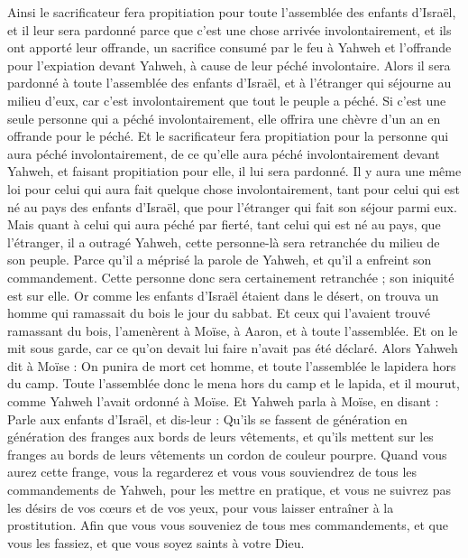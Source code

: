 \begin{multicols}{2}
Ainsi le sacrificateur fera propitiation pour toute l'assemblée des enfants d'Israël, et il leur sera pardonné parce que c'est une chose arrivée involontairement, et ils ont apporté leur offrande, un sacrifice consumé par le feu à Yahweh et l'offrande pour l'expiation devant Yahweh, à cause de leur péché involontaire.
Alors il sera pardonné à toute l'assemblée des enfants d'Israël, et à l'étranger qui séjourne au milieu d'eux, car c'est involontairement que tout le peuple a péché.
Si c'est une seule personne qui a péché involontairement, elle offrira une chèvre d'un an en offrande pour le péché.
Et le sacrificateur fera propitiation pour la personne qui aura péché involontairement, de ce qu'elle aura péché involontairement devant Yahweh, et faisant propitiation pour elle, il lui sera pardonné.
Il y aura une même loi pour celui qui aura fait quelque chose involontairement, tant pour celui qui est né au pays des enfants d'Israël, que pour l'étranger qui fait son séjour parmi eux.
Mais quant à celui qui aura péché par fierté, tant celui qui est né au pays, que l'étranger, il a outragé Yahweh, cette personne-là sera retranchée du milieu de son peuple.
Parce qu'il a méprisé la parole de Yahweh, et qu'il a enfreint son commandement. Cette personne donc sera certainement retranchée ; son iniquité est sur elle.
Or comme les enfants d'Israël étaient dans le désert, on trouva un homme qui ramassait du bois le jour du sabbat.
Et ceux qui l'avaient trouvé ramassant du bois, l'amenèrent à Moïse, à Aaron, et à toute l'assemblée.
Et on le mit sous garde, car ce qu'on devait lui faire n'avait pas été déclaré.
Alors Yahweh dit à Moïse : On punira de mort cet homme, et toute l'assemblée le lapidera hors du camp.
Toute l'assemblée donc le mena hors du camp et le lapida, et il mourut, comme Yahweh l'avait ordonné à Moïse.
Et Yahweh parla à Moïse, en disant :
Parle aux enfants d'Israël, et dis-leur : Qu'ils se fassent de génération en génération des franges aux bords de leurs vêtements, et qu'ils mettent sur les franges au bords de leurs vêtements un cordon de couleur pourpre.
Quand vous aurez cette frange, vous la regarderez et vous vous souviendrez de tous les commandements de Yahweh, pour les mettre en pratique, et vous ne suivrez pas les désirs de vos cœurs et de vos yeux, pour vous laisser entraîner à la prostitution.
Afin que vous vous souveniez de tous mes commandements, et que vous les fassiez, et que vous soyez saints à votre Dieu.

\end{multicols}
